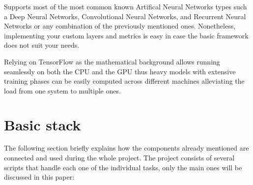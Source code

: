 Supports most of the most common known Artifical Neural Networks types such a Deep Neural Networks, Convolutional Neural Networks, and Recurrent Neural Networks or any combination of the previously mentioned ones. 
Nonetheless, implementing your custom layers and metrics is easy in case the basic framework does not suit your needs.

Relying on TensorFlow as the mathematical background allows running seamlessly on both the CPU and the GPU thus heavy models with extensive training phases can be easily computed across different machines alleviating the load from one system to multiple ones.

\newpage

\section{Basic stack}
The following section briefly explains how the components already mentioned are connected and used during the whole project.
The project consists of several scripts that handle each one of the individual tasks, only the main ones will be discussed in this paper:

